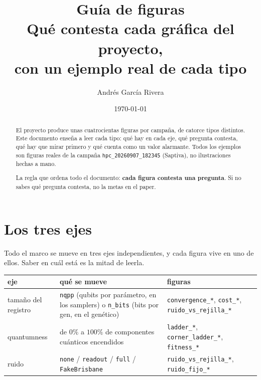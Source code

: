 \documentclass[11pt,a4paper]{article}
\title{\bfseries Guía de figuras\\[.3em]
  \large Qué contesta cada gráfica del proyecto,\\
  con un ejemplo real de cada tipo}
\author{Andrés García Rivera}
\date{\today}
\begin{document}
\maketitle

\begin{abstract}
\noindent
El proyecto produce unas cuatrocientas figuras por campaña, de catorce tipos
distintos. Este documento enseña a leer cada tipo: qué hay en cada eje, qué
pregunta contesta, qué hay que mirar primero y qué cuenta como un valor
alarmante. Todos los ejemplos son figuras reales de la campaña
\texttt{hpc\_20260907\_182345} (Saptiva), no ilustraciones hechas a mano.

\medskip\noindent
La regla que ordena todo el documento: \textbf{cada figura contesta una
pregunta}. Si no sabes qué pregunta contesta, no la metas en el paper.
\end{abstract}

\tableofcontents
\bigskip

\section{Los tres ejes}

Todo el marco se mueve en tres ejes independientes, y cada figura vive en uno
de ellos. Saber en cuál está es la mitad de leerla.

\begin{center}
\small
\begin{tabular}{@{}>{\raggedright\arraybackslash}p{3.3cm}>{\raggedright\arraybackslash}p{6.2cm}>{\raggedright\arraybackslash}p{5.6cm}@{}}
\toprule
\textbf{eje} & \textbf{qué se mueve} & \textbf{figuras} \\
\midrule
tamaño del registro
  & \texttt{nqpp} (qubits por parámetro, en los samplers) o \texttt{n\_bits}
    (bits por gen, en el genético)
  & \texttt{convergence\_*}, \texttt{cost\_*}, \texttt{ruido\_vs\_rejilla\_*} \\
\addlinespace
quantumness
  & de $0\%$ a $100\%$ de componentes cuánticos encendidos
  & \texttt{ladder\_*}, \texttt{corner\_ladder\_*}, \texttt{fitness\_*} \\
\addlinespace
ruido
  & \texttt{none} / \texttt{readout} / \texttt{full} / \texttt{FakeBrisbane}
  & \texttt{ruido\_vs\_rejilla\_*}, \texttt{ruido\_fijo\_*} \\
\bottomrule
\end{tabular}
\end{center}
\end{document}
